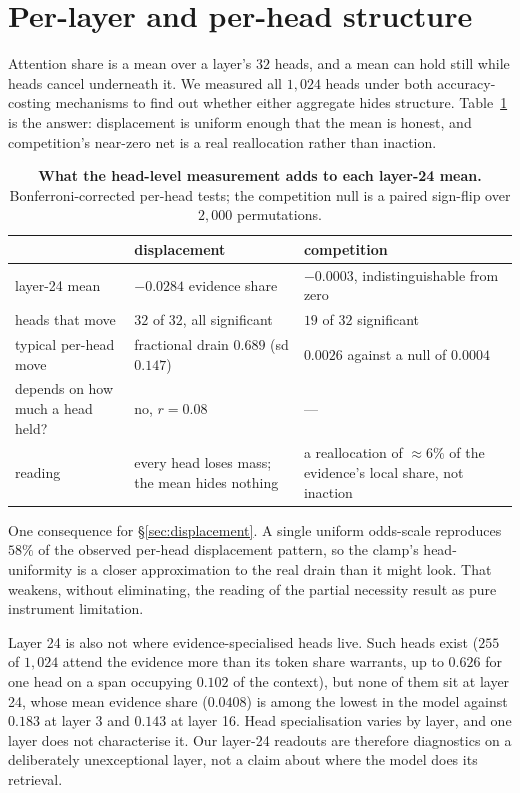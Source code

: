 \documentclass{article}
\begin{document}
\section{Per-layer and per-head structure}
\label{app:heads}

Attention share is a mean over a layer's $32$ heads, and a mean can hold still while heads
cancel underneath it. We measured all $1{,}024$ heads under both accuracy-costing mechanisms
to find out whether either aggregate hides structure. Table~\ref{tab:heads} is the answer:
displacement is uniform enough that the mean is honest, and competition's near-zero net is a
real reallocation rather than inaction.

\begin{table}[H]
  \centering\small
  \caption{\textbf{What the head-level measurement adds to each layer-24 mean.}
  Bonferroni-corrected per-head tests; the competition null is a paired sign-flip over
  $2{,}000$ permutations.}
  \label{tab:heads}
  \setlength{\tabcolsep}{5pt}
  \begin{tabular}{@{}l p{} p{}@{}}
    \toprule
     & displacement & competition\\
    \midrule
    layer-24 mean & $-0.0284$ evidence share & $-0.0003$, indistinguishable from zero\\
    heads that move & $32$ of $32$, all significant & $19$ of $32$ significant\\
    typical per-head move & fractional drain $0.689$ (sd $0.147$) & $0.0026$ against a null of $0.0004$\\
    depends on how much a head held? & no, $r{=}0.08$ & ---\\
    reading & every head loses mass; the mean hides nothing & a reallocation of ${\approx}6\%$ of the evidence's local share, not inaction\\
    \bottomrule
  \end{tabular}
\end{table}

\noindent One consequence for \S\ref{sec:displacement}. A single uniform odds-scale reproduces
$58\%$ of the observed per-head displacement pattern, so the clamp's head-uniformity is a
closer approximation to the real drain than it might look. That weakens, without eliminating,
the reading of the partial necessity result as pure instrument limitation.

Layer 24 is also not where evidence-specialised heads live. Such heads exist ($255$ of
$1{,}024$ attend the evidence more than its token share warrants, up to $0.626$ for one head
on a span occupying $0.102$ of the context), but none of them sit at layer 24, whose mean
evidence share ($0.0408$) is among the lowest in the model against $0.183$ at layer 3 and
$0.143$ at layer 16. Head specialisation varies by layer, and one layer does not characterise
it. Our layer-24 readouts are therefore diagnostics on a deliberately unexceptional layer, not
a claim about where the model does its retrieval.
\end{document}
